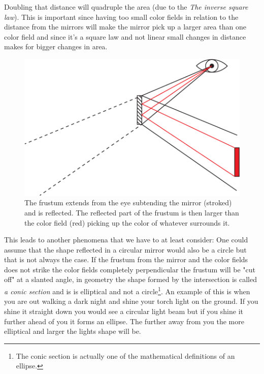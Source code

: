 \documentclass{article}
\begin{document}
Doubling that distance will quadruple the area (due to the \emph{The
inverse square law}). This is important since having too small color
fields in relation to the distance from the mirrors will make the mirror
pick up a larger area than one color field and since it's a square law
and not linear small changes in distance makes for bigger changes in
area.

\begin{figure}[ht!]
\centering
\includegraphics{images/inverse-square-law-frustum.png}
\caption{The frustum extends from the eye subtending the mirror (stroked) and is reflected. The reflected part of the frustum is then larger than the color field (red) picking up the color of whatever surrounds it.}
\end{figure}


This leads to another phenomena that we have to at least consider: One
could assume that the shape reflected in a circular mirror would also be
a circle but that is not always the case. If the frustum from the mirror
and the color fields does not strike the color fields completely
perpendicular the frustum will be "cut off" at a slanted angle, in
geometry the shape formed by the intersection is called \emph{a conic
section} and is is elliptical and not a circle\footnote{The conic
  section is actually one of the mathematical definitions of an ellipse.}.
An example of this is when you are out walking a dark night and shine
your torch light on the ground. If you shine it straight down you would
see a circular light beam but if you shine it further ahead of you it
forms an ellipse. The further away from you the more elliptical and
larger the lights shape will be.
\end{document}
